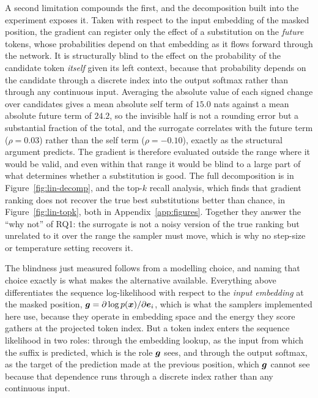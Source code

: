 A second limitation compounds the first, and the decomposition built into the experiment exposes it. Taken with respect to the input embedding of the masked position, the gradient can register only the effect of a substitution on the \emph{future} tokens, whose probabilities depend on that embedding as it flows forward through the network. It is structurally blind to the effect on the probability of the candidate token \emph{itself} given its left context, because that probability depends on the candidate through a discrete index into the output softmax rather than through any continuous input. Averaging the absolute value of each signed change over candidates gives a mean absolute self term of $15.0$ nats against a mean absolute future term of $24.2$, so the invisible half is not a rounding error but a substantial fraction of the total, and the surrogate correlates with the future term ($\rho = 0.03$) rather than the self term ($\rho = -0.10$), exactly as the structural argument predicts.
The gradient is therefore evaluated outside the range where it would be valid, and even within that range it would be blind to a large part of what determines whether a substitution is good. The full decomposition is in Figure~\ref{fig:lin-decomp}, and the top-$k$ recall analysis, which finds that gradient ranking does not recover the true best substitutions better than chance, in Figure~\ref{fig:lin-topk}, both in Appendix~\ref{app:figures}. Together they answer the ``why not'' of RQ1: the surrogate is not a noisy version of the true ranking but unrelated to it over the range the sampler must move, which is why no step-size or temperature setting recovers it.

\label{sec:results-onehot}

The blindness just measured follows from a modelling choice, and naming that choice exactly is what makes the alternative available. Everything above differentiates the sequence log-likelihood with respect to the \emph{input embedding} at the masked position, $\bm{g} = \partial \log p(\bm{x}) / \partial \bm{e}_i$, which is what the samplers implemented here use, because they operate in embedding space and the energy they score gathers at the projected token index. But a token index enters the sequence likelihood in two roles: through the embedding lookup, as the input from which the suffix is predicted, which is the role $\bm{g}$ sees, and through the output softmax, as the target of the prediction made at the previous position, which $\bm{g}$ cannot see because that dependence runs through a discrete index rather than any continuous input.


